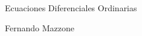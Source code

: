 \documentclass[12pt]{book}
\begin{document}

\newcommand{\nn}{\mathbb{N}}
\newcommand{\rr}{\mathbb{R}}
\newcommand{\C}{\overline}
\renewcommand{\chaptername}{Unidad}
\newcommand{\resa}[1]{\emph{#1}\index{#1}}
\newcommand{\p}{\varphi}
\newcommand{\oo}{\Omega}

\newenvironment{demo}{\noindent\emph{Dem.}}{$\square$ \newline\vspace{5pt}}
\begin{center}
\begin{Huge}
   Ecuaciones Diferenciales Ordinarias
\end{Huge}

\begin{Large}

\vspace{1cm}

Fernando Mazzone
\end{Large}

\vspace{1in}



\end{center}




\tableofcontents










\printindex
\end{document}
